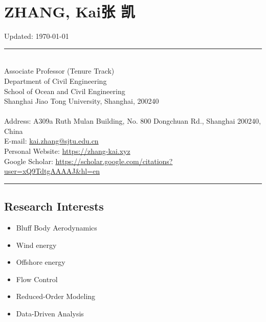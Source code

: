 \documentclass[10pt]{article}
\newenvironment{myitemize}
{ \begin{itemize}
    \setlength{\itemsep}{0pt}
    \setlength{\parskip}{0pt}
    \setlength{\parsep}{0pt}     }
{ \end{itemize}                  }
\begin{document}
\section*{{\huge ZHANG, Kai\quad  张 凯}} 

\vspace{-0.6in}
\null\hfill {\scriptsize Updated:   \today}

\begin{center}
\rule{\textwidth}{0.5pt}
\end{center}
\vspace{-0.34in}
~\\

\noindent Associate Professor (Tenure Track)\\ 
Department of Civil Engineering\\
School of Ocean and Civil Engineering\\
Shanghai Jiao Tong University, Shanghai, 200240\\
~\\
Address: A309a Ruth Mulan Building, No. 800 Dongchuan Rd., Shanghai 200240, China\\
E-mail: \href{kai.zhang@sjtu.edu.cn}{kai.zhang@sjtu.edu.cn}\\
Personal Website: \href{https://zhang-kai.xyz}{https://zhang-kai.xyz} \\
Google Scholar: \href{https://scholar.google.com/citations?user=xQ9TdtgAAAAJ&hl=en}{https://scholar.google.com/citations?user=xQ9TdtgAAAAJ\&hl=en}\\

\vspace{-0.34in}
\begin{center}
\rule{\textwidth}{0.5pt}
\end{center}

\subsection*{Research Interests}

\begin{multicols}{2}
\begin{myitemize}
\item Bluff Body Aerodynamics
\item Wind energy 
\item Offshore energy
\item Flow Control
\item Reduced-Order Modeling
\item Data-Driven Analysis


\end{myitemize}
\end{multicols}
\end{document}
